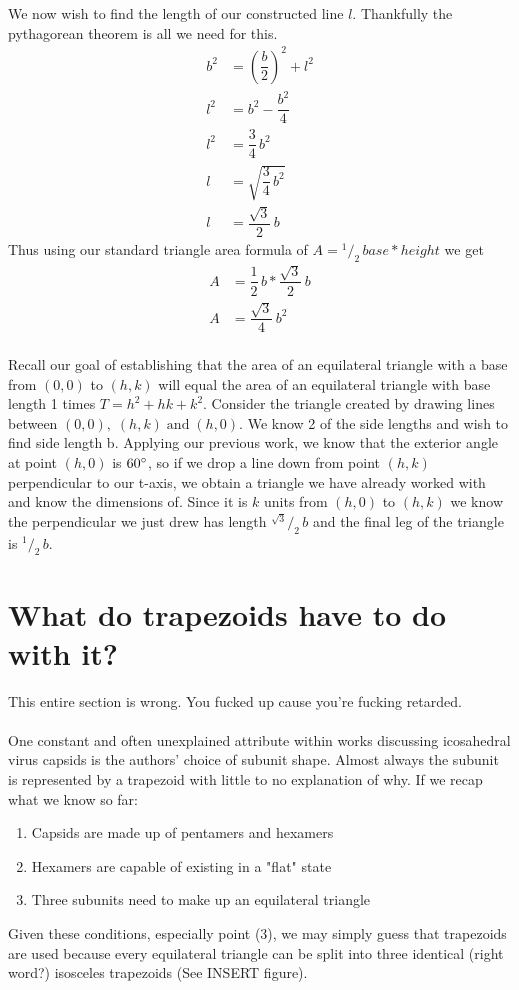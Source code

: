 \documentclass[12pt,letter]{article}
\newcommand*\rfrac[2]{{}^{#1}\!/_{#2}}
\begin{document}
We now wish to find the length of our constructed line $l$. Thankfully the pythagorean theorem is all we need for this.
\begin{align*}
b^2 &= \left(\dfrac{b} {2}\right)^2 + l^2 \\
l^2 &= b^2 - \dfrac{b^2} {4} \\
l^2 &= \dfrac{3} {4} \, b^2 \\
l &= \sqrt{\dfrac{3} {4} \, b^2} \\
l &= \dfrac{\sqrt{3}} {2} \, b
\end{align*}
Thus using our standard triangle area formula of $A = \rfrac{1} {2} \, base * height$ we get
\begin{align*}
A &= \dfrac{1} {2} \, b * \dfrac{\sqrt{3}} {2} \, b \\
A &= \dfrac{\sqrt{3}} {4} \, b^2
\end{align*} \\

Recall our goal of establishing that the area of an equilateral triangle with a base from $(0,0)$ to $(h,k)$ will equal the area of an equilateral triangle with base length 1 times $T = h^2 + hk + k^2$. Consider the triangle created by drawing lines between $(0,0), \; (h,k) \; \text{and} \; (h,0)$. We know 2 of the side lengths and wish to find side length b. Applying our previous work, we know that the exterior angle at point $(h,0)$ is $60\degree$, so if we drop a line down from point $(h,k)$ perpendicular to our t-axis, we obtain a triangle we have already worked with and know the dimensions of. Since it is $k$ units from $(h,0)$ to $(h,k)$ we know the perpendicular we just drew has length $\rfrac{\sqrt{3}} {2} \, b$ and the final leg of the triangle is $\rfrac 1 2 \, b$.

\section{What do trapezoids have to do with it?}
This entire section is wrong. You fucked up cause you're fucking retarded.

\paragraph{}
One constant and often unexplained attribute within works discussing icosahedral virus capsids is the authors' choice of subunit shape. Almost always the subunit is represented by a trapezoid with little to no explanation of why. If we recap what we know so far:
\begin{enumerate}
	\item Capsids are made up of pentamers and hexamers
	\item Hexamers are capable of existing in a "flat" state
	\item Three subunits need to make up an equilateral triangle
\end{enumerate}
Given these conditions, especially point (3), we may simply guess that trapezoids are used because every equilateral triangle can be split into three identical (right word?) isosceles trapezoids (See INSERT figure). 
\end{document}
